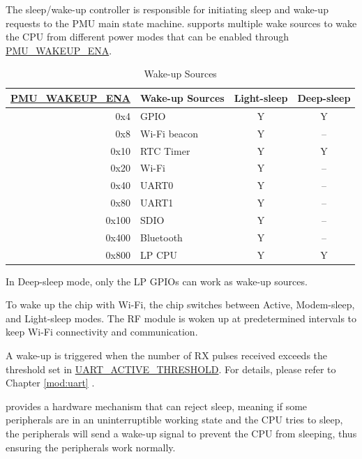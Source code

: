 \documentclass[main\_\_EN.tex]{subfiles}
\begin{document}
The sleep/wake-up controller is responsible for initiating sleep and wake-up requests to the PMU main state machine. \chipname{} supports multiple wake sources to wake the CPU from different power modes that can be enabled through \hyperref[fielddesc:PMUWAKEUPENA]{PMU\_WAKEUP\_ENA}.

\begin{table}[H]
    \centering
    \caption{Wake-up Sources}
    \label{tab:lowpowm-wakeup-source}
    \begin{threeparttable}
    \begin{tabular}{| r | l | c | c |}
    \hline
    \rowcolor{lightgray}
    \textbf{\hyperref[fielddesc:PMUWAKEUPENA]{PMU\_WAKEUP\_ENA}} & \textbf{Wake-up Sources} &  \textbf{Light-sleep} & \textbf{Deep-sleep}  \\\hline
    0x4 & GPIO\tnote{1} & Y & Y \\\hline
    0x8 & Wi-Fi beacon  & Y & – \\\hline
    0x10 & RTC Timer  & Y & Y \\\hline
    0x20 & Wi-Fi\tnote{2} & Y & – \\\hline
    0x40 & UART0\tnote{3} & Y & – \\\hline
    0x80 & UART1\tnote{3} & Y & – \\\hline
    0x100 & SDIO & Y & – \\\hline
    0x400 & Bluetooth & Y & – \\\hline
    0x800 & LP CPU  & Y & Y \\\hline
    \end{tabular}

\begin{tablenotes}
    \item[1] In Deep-sleep mode, only the LP GPIOs can work as wake-up sources.
    \item[2] To wake up the chip with Wi-Fi, the chip switches between Active, Modem-sleep, and Light-sleep modes. The RF module is woken up at predetermined intervals to keep Wi-Fi connectivity and communication.
    \item[3] A wake-up is triggered when the number of RX pulses received exceeds the threshold set in \hyperref[fielddesc:UARTACTIVETHRESHOLD]{UART\_ACTIVE\_THRESHOLD}. For details, please refer to Chapter \ref{mod:uart} \textit{}.
\end{tablenotes}
\end{threeparttable}
\end{table}

\chipname{} provides a hardware mechanism that can reject sleep, meaning if some peripherals are in an uninterruptible working state and the CPU tries to sleep, the peripherals will send a wake-up signal to prevent the CPU from sleeping, thus ensuring the peripherals work normally.
\end{document}
